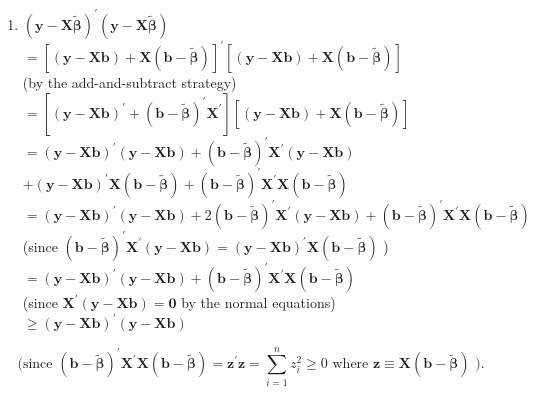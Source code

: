 \documentclass[10pt]{article}
\begin{document}
\begin{enumerate}
  \item $(\mathbf{y}-\mathbf{X} \widetilde{\boldsymbol{\beta}})^{\prime}(\mathbf{y}-\mathbf{X} \widetilde{\boldsymbol{\beta}})$\\
$=[(\mathbf{y}-\mathbf{X b})+\mathbf{X}(\mathbf{b}-\widetilde{\boldsymbol{\beta}})]^{\prime}[(\mathbf{y}-\mathbf{X b})+\mathbf{X}(\mathbf{b}-\widetilde{\boldsymbol{\beta}})]$\\
(by the add-and-subtract strategy)\\
$=\left[(\mathbf{y}-\mathbf{X b})^{\prime}+(\mathbf{b}-\widetilde{\boldsymbol{\beta}})^{\prime} \mathbf{X}^{\prime}\right][(\mathbf{y}-\mathbf{X} \mathbf{b})+\mathbf{X}(\mathbf{b}-\widetilde{\boldsymbol{\beta}})]$\\
$=(\mathbf{y}-\mathbf{X b})^{\prime}(\mathbf{y}-\mathbf{X b})+(\mathbf{b}-\widetilde{\boldsymbol{\beta}})^{\prime} \mathbf{X}^{\prime}(\mathbf{y}-\mathbf{X b})$\\
$+(\mathbf{y}-\mathbf{X b})^{\prime} \mathbf{X}(\mathbf{b}-\widetilde{\boldsymbol{\beta}})+(\mathbf{b}-\widetilde{\boldsymbol{\beta}})^{\prime} \mathbf{X}^{\prime} \mathbf{X}(\mathbf{b}-\widetilde{\boldsymbol{\beta}})$\\
$=(\mathbf{y}-\mathbf{X b})^{\prime}(\mathbf{y}-\mathbf{X b})+2(\mathbf{b}-\widetilde{\boldsymbol{\beta}})^{\prime} \mathbf{X}^{\prime}(\mathbf{y}-\mathbf{X b})+(\mathbf{b}-\widetilde{\boldsymbol{\beta}})^{\prime} \mathbf{X}^{\prime} \mathbf{X}(\mathbf{b}-\widetilde{\boldsymbol{\beta}})$\\
(since $(\mathbf{b}-\widetilde{\boldsymbol{\beta}})^{\prime} \mathbf{X}^{\prime}(\mathbf{y}-\mathbf{X b})=(\mathbf{y}-\mathbf{X b})^{\prime} \mathbf{X}(\mathbf{b}-\widetilde{\boldsymbol{\beta}})$ )\\
$=(\mathbf{y}-\mathbf{X b})^{\prime}(\mathbf{y}-\mathbf{X b})+(\mathbf{b}-\widetilde{\boldsymbol{\beta}})^{\prime} \mathbf{X}^{\prime} \mathbf{X}(\mathbf{b}-\widetilde{\boldsymbol{\beta}})$\\
(since $\mathbf{X}^{\prime}(\mathbf{y}-\mathbf{X b})=\mathbf{0}$ by the normal equations)\\
$\geq(\mathbf{y}-\mathbf{X b})^{\prime}(\mathbf{y}-\mathbf{X b})$
\end{enumerate}

$$
\text { (since }(\mathbf{b}-\widetilde{\boldsymbol{\beta}})^{\prime} \mathbf{X}^{\prime} \mathbf{X}(\mathbf{b}-\widetilde{\boldsymbol{\beta}})=\mathbf{z}^{\prime} \mathbf{z}=\sum_{i=1}^{n} z_{i}^{2} \geq 0 \text { where } \mathbf{z} \equiv \mathbf{X}(\mathbf{b}-\widetilde{\boldsymbol{\beta}}) \text { ). }
$$
\end{document}
